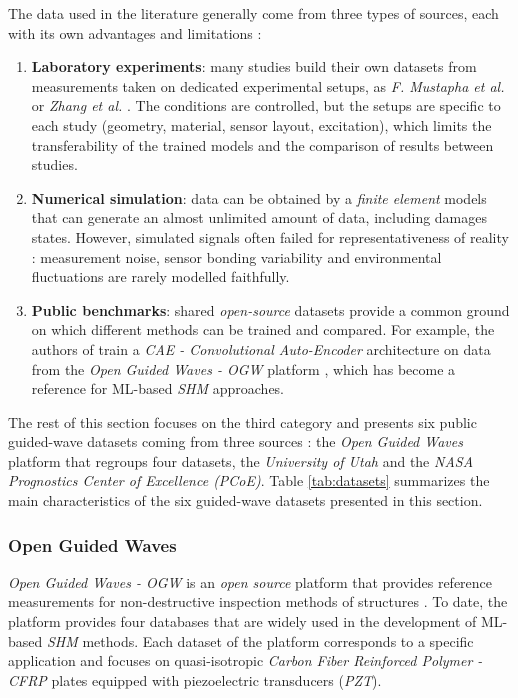 \documentclass[12pt]{article}
\begin{document}
The data used in the literature generally come from three types of sources, each with its own advantages and limitations :
 
\begin{enumerate}[itemsep=8pt]
 
    \item \textbf{Laboratory experiments}: many studies build their own datasets from measurements taken on dedicated experimental setups, as \textit{F. Mustapha et al.} \cite{MUSTAPHA20071885} or \textit{Zhang et al.} \cite{ZHANG2021107107}. The conditions are controlled, but the setups are specific to each study (geometry, material, sensor layout, excitation), which limits the transferability of the trained models and the comparison of results between studies.
 
    \item \textbf{Numerical simulation}: data can be obtained by a \textit{finite element} models that can generate an almost unlimited amount of data, including damages states. However, simulated signals often failed for representativeness of reality : measurement noise, sensor bonding variability and environmental fluctuations are rarely modelled faithfully.
 
    \item \textbf{Public benchmarks}: shared \textit{open-source} datasets provide a common ground on which different methods can be trained and compared. For example, the authors of \cite{SAWANT2023106931} train a \textit{CAE - Convolutional Auto-Encoder} architecture on data from the \textit{Open Guided Waves - OGW} platform \cite{moll2019ogw}, which has become a reference for ML-based \textit{SHM} approaches.
 
\end{enumerate}
 
The rest of this section focuses on the third category and presents six public guided-wave datasets coming from three sources : the \textit{Open Guided Waves} platform that regroups four datasets, the \textit{University of Utah} and the \textit{NASA Prognostics Center of Excellence (PCoE)}. Table \ref{tab:datasets} summarizes the main characteristics of the six guided-wave datasets presented in this section.
 
\subsubsection{Open Guided Waves}
 
\textit{Open Guided Waves - OGW} is an \textit{open source} platform that provides reference measurements for non-destructive inspection methods of structures \cite{moll2019ogw}. To date, the platform provides four databases that are widely used in the development of ML-based \textit{SHM} methods. Each dataset of the platform corresponds to a specific application and focuses on quasi-isotropic \textit{Carbon Fiber Reinforced Polymer - CFRP} plates equipped with piezoelectric transducers (\textit{PZT}). \\
 
\end{document}
